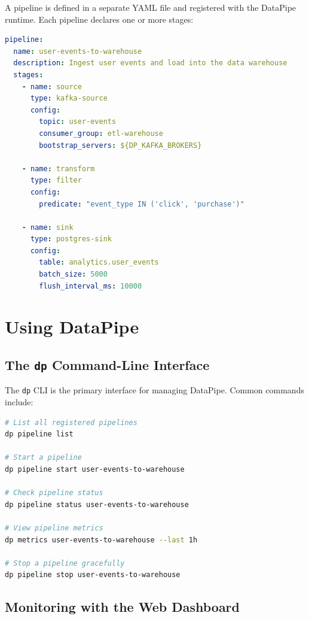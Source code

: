 \documentclass[
    language=english,
    doctype=manual,
    institution=none,
    titlestyle=book,
    oneside,
]{../../omnilatex}
\begin{document}
A pipeline is defined in a separate YAML file and registered with the
DataPipe runtime. Each pipeline declares one or more stages:

\begin{lstlisting}[language=yaml, caption={Example pipeline definition.}]
pipeline:
  name: user-events-to-warehouse
  description: Ingest user events and load into the data warehouse
  stages:
    - name: source
      type: kafka-source
      config:
        topic: user-events
        consumer_group: etl-warehouse
        bootstrap_servers: ${DP_KAFKA_BROKERS}

    - name: transform
      type: filter
      config:
        predicate: "event_type IN ('click', 'purchase')"

    - name: sink
      type: postgres-sink
      config:
        table: analytics.user_events
        batch_size: 5000
        flush_interval_ms: 10000
\end{lstlisting}

\chapter{Using DataPipe}
\label{sec:usage}

\section{The \texttt{dp} Command-Line Interface}

The \texttt{dp} CLI is the primary interface for managing DataPipe.
Common commands include:

\begin{lstlisting}[language=bash, caption={Common dp CLI commands.}]
# List all registered pipelines
dp pipeline list

# Start a pipeline
dp pipeline start user-events-to-warehouse

# Check pipeline status
dp pipeline status user-events-to-warehouse

# View pipeline metrics
dp metrics user-events-to-warehouse --last 1h

# Stop a pipeline gracefully
dp pipeline stop user-events-to-warehouse
\end{lstlisting}

\section{Monitoring with the Web Dashboard}
\end{document}
